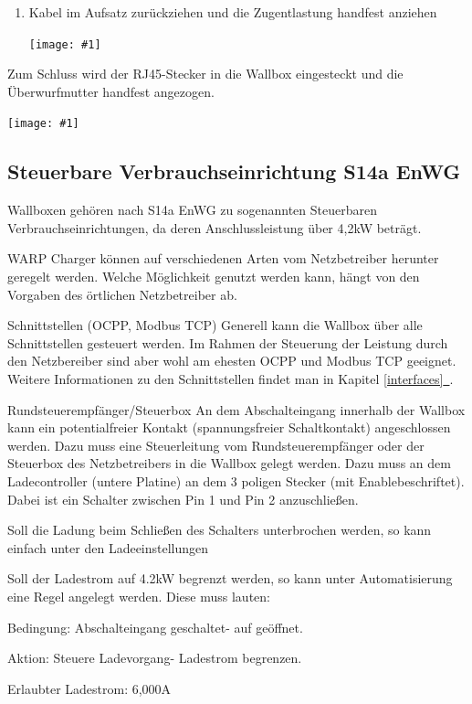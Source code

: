 \documentclass[a4paper,10pt]{article}
\newcommand{\gfx}[1]{\texttt{[image: \#1]}}
\newcommand*{\fullref}[1]{\hyperref[{#1}]{\ref*{#1}~\nameref*{#1}}}
\begin{document}
\begin{multicols*}{2}
\begin{enumerate}
		\item Kabel im Aufsatz zurückziehen und die Zugentlastung handfest anziehen

		\gfx{./img_warp2/resized/warp2_rj45_2_600}
	\end{enumerate}

	Zum Schluss wird der RJ45-Stecker in die Wallbox eingesteckt und die Überwurfmutter
	handfest angezogen.

	\gfx{./img_warp2/resized/warp2_ethernet4_600} %

    \subsection{Steuerbare Verbrauchseinrichtung S14a EnWG}
    Wallboxen gehören nach S14a EnWG zu sogenannten Steuerbaren
    Verbrauchseinrichtungen, da deren Anschlussleistung über 4,2kW beträgt.

    WARP Charger können auf verschiedenen Arten vom Netzbetreiber herunter
    geregelt werden. Welche Möglichkeit genutzt werden kann, hängt von den
    Vorgaben des örtlichen Netzbetreiber ab.

    \begin{description}
        \item{Schnittstellen (OCPP, Modbus TCP)} Generell kann die Wallbox über
        alle Schnittstellen gesteuert werden. Im Rahmen der Steuerung der
        Leistung durch den Netzbereiber sind aber wohl am ehesten OCPP und
        Modbus TCP geeignet. Weitere Informationen zu den Schnittstellen findet
		man in Kapitel \fullref{interfaces}.
        \item{Rundsteuerempfänger/Steuerbox} An dem Abschalteingang innerhalb
        der Wallbox kann ein potentialfreier Kontakt (spannungsfreier Schaltkontakt) 
		angeschlossen werden. Dazu muss eine Steuerleitung vom Rundsteuerempfänger 
		oder der Steuerbox des Netzbetreibers in die Wallbox gelegt werden. Dazu
		muss an dem Ladecontroller (untere Platine) an dem 3 poligen Stecker
		(mit \glqq Enable\grqq beschriftet). Dabei ist ein Schalter zwischen Pin
		1 und Pin 2 anzuschließen.

		Soll die Ladung beim Schließen des Schalters unterbrochen werden, so
		kann einfach unter den Ladeeinstellungen

		Soll der Ladestrom auf 4.2kW begrenzt werden, so kann unter
		Automatisierung eine Regel angelegt werden. Diese muss lauten:

		\begin{description}
			\item{Bedingung:} \glqq Abschalteingang geschaltet\grqq - \glqq auf geöffnet\grqq.
			\item{Aktion:} \glqq Steuere Ladevorgang\grqq - \glqq Ladestrom begrenzen\grqq.
			\item{Erlaubter Ladestrom:} 6,000A
		\end{description}


\end{description}
\end{multicols*}
\end{document}
